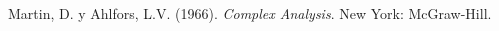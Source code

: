\documentclass[a4paper, 11pt]{article}
\begin{document}
\theoremstyle{remark}
\newtheorem*{example}{Ejemplo}
\newtheorem*{exercise}{Ejercicio}
\newtheorem*{note}{\(*\)}

\newcommand{\R}{\mathbb{R}}
\newcommand{\N}{\mathbb{N}}
\newcommand{\C}{\mathbb{C}}
\newcommand{\K}{\mathbb{K}}
\newcommand{\Li}{\mathcal{L}}
\newcommand{\E}{\vspace{0.2in}}
\newcommand{\ab}{{\rotatebox{0}{\scriptsize$\lor$}}}
\newcommand{\ce}{{\text{\ \large \rotatebox{90}{$\triangleleft$}}}}







\begin{thebibliography}{9}

Martin, D. y Ahlfors, L.V. (1966). \textit{Complex Analysis}. New York: McGraw-Hill.

\end{thebibliography}

\end{document}
